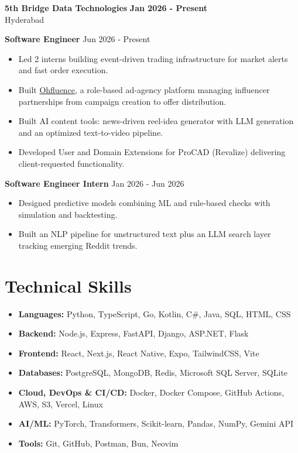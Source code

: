 \documentclass[a4paper,11pt]{article}
\newcommand{\resumeItem}[1]{\item \small{#1}}
\newcommand{\resumeSubheading}[4]{%
  \textbf{#1} \hfill \textbf{#2} \\
{#3} \hfill {#4}
}
\newcommand{\resumeSubHeadingListStart}{\begin{itemize}}
\newcommand{\resumeSubHeadingListEnd}{\end{itemize}}
\begin{document}
\resumeSubheading
{5th Bridge Data Technologies}{Jan 2026 - Present}
{Hyderabad}{}

\textbf{Software Engineer} \hfill {Jun 2026 - Present}
\resumeSubHeadingListStart
\resumeItem{Led 2 interns building event-driven trading infrastructure for market alerts and fast order execution.}
\resumeItem{Built \href{https://ohfluence.com}{Ohfluence}, a role-based ad-agency platform managing influencer partnerships from campaign creation to offer distribution.}
\resumeItem{Built AI content tools: news-driven reel-idea generator with LLM generation and an optimized text-to-video pipeline.}
\resumeItem{Developed User and Domain Extensions for ProCAD (Revalize) delivering client-requested functionality.}
\resumeSubHeadingListEnd

\textbf{Software Engineer Intern} \hfill {Jan 2026 - Jun 2026}
\resumeSubHeadingListStart
\resumeItem{Designed predictive models combining ML and rule-based checks with simulation and backtesting.}
\resumeItem{Built an NLP pipeline for unstructured text plus an LLM search layer tracking emerging Reddit trends.}
\resumeSubHeadingListEnd


\section*{Technical Skills}
\begin{itemize}
\item \textbf{Languages:} Python, TypeScript, Go, Kotlin, C\#, Java, SQL, HTML, CSS
\item \textbf{Backend:} Node.js, Express, FastAPI, Django, ASP.NET, Flask
\item \textbf{Frontend:} React, Next.js, React Native, Expo, TailwindCSS, Vite
\item \textbf{Databases:} PostgreSQL, MongoDB, Redis, Microsoft SQL Server, SQLite
\item \textbf{Cloud, DevOps \& CI/CD:} Docker, Docker Compose, GitHub Actions, AWS, S3, Vercel, Linux
\item \textbf{AI/ML:} PyTorch, Transformers, Scikit-learn, Pandas, NumPy, Gemini API
\item \textbf{Tools:} Git, GitHub, Postman, Bun, Neovim
\end{itemize}
\vspace{-0.2em}
\end{document}
